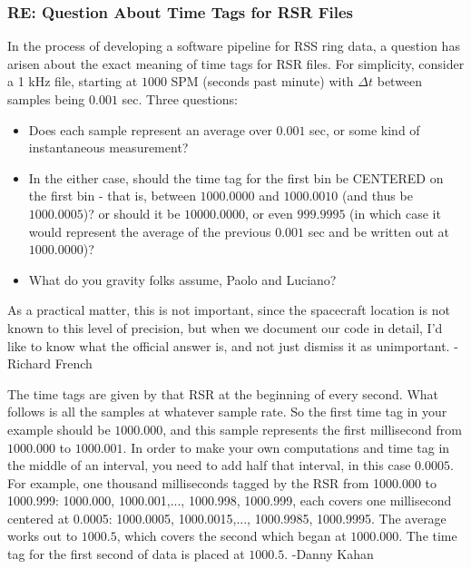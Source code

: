 \documentclass[crop=false,class=article,oneside]{standalone}
\begin{document}
\subsubsection{\footnotesize RE: Question About Time Tags for RSR Files}
In the process of developing a software pipeline for RSS ring data, a question has arisen about the exact meaning of time tags for RSR files. For simplicity, consider a 1 kHz file, starting at $1000$ SPM (seconds past minute) with $\Delta t$ between samples being $0.001$ sec. Three questions:
\begin{itemize}
    \item Does each sample     represent an average over $0.001$ sec, or some kind of instantaneous measurement?
    \item In the either case, should the time tag for the first bin be CENTERED  on the first bin - that is, between $1000.0000$ and $1000.0010$ (and thus be $1000.0005$)? or should it be $10000.0000$, or even $999.9995$ (in which case it would represent the average of the previous $0.001$ sec and be written out at $1000.0000$)?
    \item What do you gravity folks assume, Paolo and Luciano?
\end{itemize}
As a practical matter, this is not important, since the spacecraft location is not known to this level of precision, but when we document our code in detail, I'd like to know what the official answer is, and not just dismiss it as unimportant. -Richard French\par
The time tags are given by that RSR at the beginning of every second. What follows is all the samples at whatever sample rate. So the first time tag in your example should be $1000.000$, and this sample represents the first millisecond from $1000.000$ to $1000.001$. In order to make your own computations and time tag in the middle of an interval, you need to add half that interval, in this case $0.0005$. For example, one thousand milliseconds tagged by the RSR from 1000.000 to 1000.999: 1000.000, 1000.001,..., 1000.998, 1000.999, each covers one millisecond centered at 0.0005: 1000.0005, 1000.0015,..., 1000.9985, 1000.9995. The average works out to $1000.5$, which covers the second which began at $1000.000$. The time tag for the first second of data is placed at $1000.5$. -Danny Kahan
\end{document}
